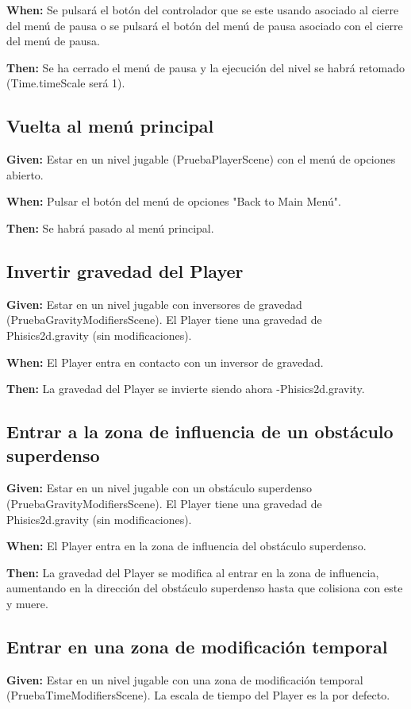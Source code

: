 \textbf{When:} Se pulsará el botón del controlador que se este usando asociado al cierre del menú de pausa o se pulsará el botón del menú de pausa asociado con el cierre del menú de pausa.

\textbf{Then:} Se ha cerrado el menú de pausa y la ejecución del nivel se habrá retomado (Time.timeScale será 1).

\subsection{Vuelta al menú principal}
\textbf{Given:} Estar en un nivel jugable (PruebaPlayerScene) con el menú de opciones abierto.

\textbf{When:} Pulsar el botón del menú de opciones "Back to Main Menú".

\textbf{Then:} Se habrá pasado al menú principal.

\subsection{Invertir gravedad del Player}
\textbf{Given:} Estar en un nivel jugable con inversores de gravedad (PruebaGravityModifiersScene). El Player tiene una gravedad de Phisics2d.gravity (sin modificaciones).

\textbf{When:} El Player entra en contacto con un inversor de gravedad.

\textbf{Then:} La gravedad del Player se invierte siendo ahora -Phisics2d.gravity.

\subsection{Entrar a la zona de influencia de un obstáculo superdenso}
\textbf{Given:} Estar en un nivel jugable con un obstáculo superdenso (PruebaGravityModifiersScene). El Player tiene una gravedad de Phisics2d.gravity (sin modificaciones).

\textbf{When:} El Player entra en la zona de influencia del obstáculo superdenso.

\textbf{Then:} La gravedad del Player se modifica al entrar en la zona de influencia, aumentando en la dirección del obstáculo superdenso hasta que colisiona con este y muere.

\subsection{Entrar en una zona de modificación temporal}
\textbf{Given:} Estar en un nivel jugable con una zona de modificación temporal (PruebaTimeModifiersScene). La escala de tiempo del Player es la por defecto.

